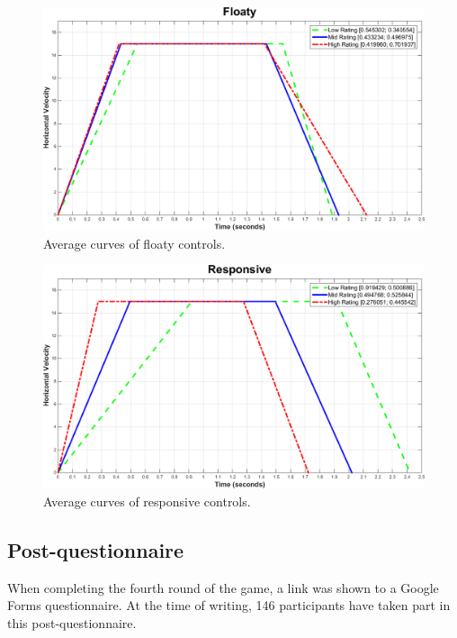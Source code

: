 \begin{figure}[htbp]
\centering
\includegraphics[width=0.9\columnwidth]{Pics/Curves/Floaty_curve}
\caption{Average curves of floaty controls.}
\label{fig:curve_floaty}
\end{figure}

\begin{figure}[htbp]
\centering
\includegraphics[width=0.9\columnwidth]{Pics/Curves/Responsive_curve}
\caption{Average curves of responsive controls.}
\label{fig:curve_responsive}
\end{figure}

\subsection{Post-questionnaire}
When completing the fourth round of the game, a link was shown to a Google Forms questionnaire. At the time of writing, 146 participants have taken part in this post-questionnaire.